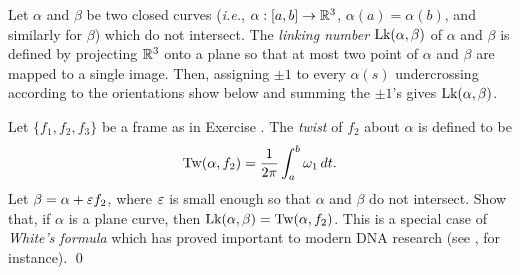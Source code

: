 \documentclass[12pt,twoside]{jarticle}
\begin{document}
\begin{question}
  Let $\alpha$ and $\beta$ be two closed curves ({\it i.e.},
  $\alpha:[a,b]\to{\mathbb R}^3$, $\alpha(a)=\alpha(b)$, and similarly for $\beta$)
  which do not intersect.  The {\em linking number} $\mathop{\text{\rm Lk}}\nolimits(\alpha,\beta)$ of
  $\alpha$ and $\beta$ is defined by projecting ${\mathbb R}^3$ onto a plane so that
  at most two point of $\alpha$ and $\beta$ are mapped to a single image.
  Then, assigning $\pm1$ to every $\alpha(s)$ undercrossing according to the 
  orientations show below and summing the $\pm1$'s gives
  $\mathop{\text{\rm Lk}}\nolimits(\alpha,\beta)$.
  \begin{center}
  
  \end{center}
  Let $\{f_1,f_2,f_3\}$ be a frame as in Exercise . 
  The {\em twist} of $f_2$ about $\alpha$ is defined to be
  \begin{equation*}
    \mathop{\text{\rm Tw}}\nolimits(\alpha,f_2)
    =
    \frac{1}{2\pi}\int_a^b \omega_1\,dt.
  \end{equation*}
  Let $\beta=\alpha+\varepsilon f_2$, where $\varepsilon$ is small enough so that $\alpha$
  and $\beta$ do not intersect.  Show that, if $\alpha$ is a plane curve,
  then $\mathop{\text{\rm Lk}}\nolimits(\alpha,\beta)=\mathop{\text{\rm Tw}}\nolimits(\alpha,f_2)$.  This is a special case of 
  {\em White's formula} which has proved important to modern DNA research
  (see \cite{Poh}, \cite{PoR} for instance).
  \qed
\end{question}

\end{document}
